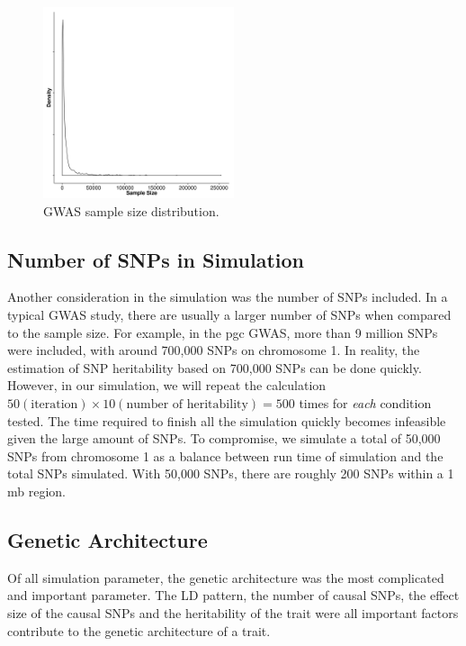 			\begin{figure}
				\centering
				\includegraphics[width=0.5\textwidth]{figure/gwasSampleSize.png}
				\caption[GWAS Sample Size distribution]{
					\gls{GWAS} sample size distribution.
				}
				\label{fig:gwasCata}
			\end{figure}
			
		\subsection{Number of SNPs in Simulation}
			Another consideration in the simulation was the number of \glspl{SNP} included.
			In a typical \gls{GWAS} study, there are usually a larger number of \glspl{SNP} when compared to the sample size. 
			For example, in the \gls{pgc}  \gls{GWAS}, more than 9 million \glspl{SNP} were included, with around 700,000 \glspl{SNP} on chromosome 1.
			In reality, the estimation of \gls{SNP} heritability based on 700,000 \glspl{SNP} can be done quickly.
			However, in our simulation, we will repeat the calculation $50(\text{iteration})\times10(\text{number of heritability})=500$ times for \emph{each} condition tested. 
			The time required to finish all the simulation quickly becomes infeasible given the large amount of \glspl{SNP}.
			To compromise, we simulate a total of 50,000 \glspl{SNP} from chromosome 1 as a balance between run time of simulation and the total \glspl{SNP} simulated.
			With 50,000 \glspl{SNP}, there are roughly 200 \glspl{SNP} within a 1 \gls{mb} region.
			
		\subsection{Genetic Architecture}
			Of all simulation parameter, the genetic architecture was the most complicated and important parameter. 
			The \gls{LD} pattern, the number of causal \glspl{SNP}, the effect size of the causal \glspl{SNP} and the heritability of the trait were all important factors contribute to the genetic architecture of a trait. 
		
